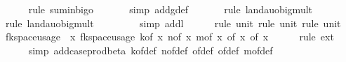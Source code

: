 \begin{isabellebody}
\ \ \ \ \isamarkupfalse%
\ {\isacharparenleft}{\kern0pt}rule\ sum{\isacharunderscore}{\kern0pt}in{\isacharunderscore}{\kern0pt}bigo{\isacharparenright}{\kern0pt}\isanewline
\ \ \ \ \ \isamarkupfalse%
\ {\isacharparenleft}{\kern0pt}simp\ add{\isacharcolon}{\kern0pt}g{\isacharunderscore}{\kern0pt}def{\isacharparenright}{\kern0pt}\isanewline
\ \ \ \ \ \isamarkupfalse%
\ {\isacharparenleft}{\kern0pt}rule\ landau{\isacharunderscore}{\kern0pt}o{\isachardot}{\kern0pt}big{\isacharunderscore}{\kern0pt}mult{\isacharunderscore}{\kern0pt}{}{\isacharparenright}{\kern0pt}\isanewline
\ \ \ \ \ \isamarkupfalse%
\ {\isacharparenleft}{\kern0pt}rule\ landau{\isacharunderscore}{\kern0pt}o{\isachardot}{\kern0pt}big{\isacharunderscore}{\kern0pt}mult{\isacharunderscore}{\kern0pt}{}{\isacharparenright}{\kern0pt}\isanewline
\ \ \ \ \ \ \ \isamarkupfalse%
\ {\isacharparenleft}{\kern0pt}simp\ add{\isacharcolon}{\kern0pt}l{}{\isacharparenright}{\kern0pt}\isanewline
\ \ \ \ \isamarkupfalse%
\ {\isacharparenleft}{\kern0pt}rule\ unit{\isacharunderscore}{\kern0pt}{}{\isacharcomma}{\kern0pt}\ rule\ unit{\isacharunderscore}{\kern0pt}{}{\isacharcomma}{\kern0pt}\ rule\ unit{\isacharunderscore}{\kern0pt}{}{\isacharparenright}{\kern0pt}\isanewline
\isanewline
\ \ \isamarkupfalse%
\ {\isachardoublequoteopen}fk{\isacharunderscore}{\kern0pt}space{\isacharunderscore}{\kern0pt}usage\ {\isacharequal}{\kern0pt}\ {\isacharparenleft}{\kern0pt}{\isasymlambda}x{\isachardot}{\kern0pt}\ fk{\isacharunderscore}{\kern0pt}space{\isacharunderscore}{\kern0pt}usage\ {\isacharparenleft}{\kern0pt}k{\isacharunderscore}{\kern0pt}of\ x{\isacharcomma}{\kern0pt}\ n{\isacharunderscore}{\kern0pt}of\ x{\isacharcomma}{\kern0pt}\ m{\isacharunderscore}{\kern0pt}of\ x{\isacharcomma}{\kern0pt}\ {\isasymepsilon}{\isacharunderscore}{\kern0pt}of\ x{\isacharcomma}{\kern0pt}\ {\isasymdelta}{\isacharunderscore}{\kern0pt}of\ x{\isacharparenright}{\kern0pt}{\isacharparenright}{\kern0pt}{\isachardoublequoteclose}\isanewline
\ \ \ \ \isamarkupfalse%
\ {\isacharparenleft}{\kern0pt}rule\ ext{\isacharparenright}{\kern0pt}\isanewline
\ \ \ \ \isamarkupfalse%
\ {\isacharparenleft}{\kern0pt}simp\ add{\isacharcolon}{\kern0pt}case{\isacharunderscore}{\kern0pt}prod{\isacharunderscore}{\kern0pt}beta{\isacharprime}{\kern0pt}\ k{\isacharunderscore}{\kern0pt}of{\isacharunderscore}{\kern0pt}def\ n{\isacharunderscore}{\kern0pt}of{\isacharunderscore}{\kern0pt}def\ {\isasymepsilon}{\isacharunderscore}{\kern0pt}of{\isacharunderscore}{\kern0pt}def\ {\isasymdelta}{\isacharunderscore}{\kern0pt}of{\isacharunderscore}{\kern0pt}def\ m{\isacharunderscore}{\kern0pt}of{\isacharunderscore}{\kern0pt}def{\isacharparenright}{\kern0pt}\isanewline

\end{isabellebody}
